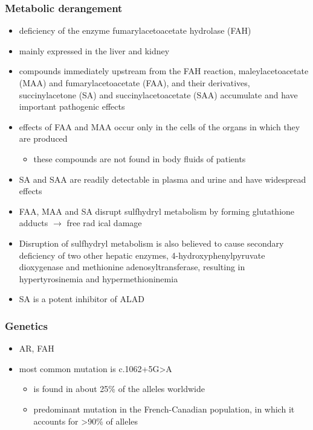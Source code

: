 \documentclass{scrartcl}
\begin{document}
\subsubsection{Metabolic derangement}
\label{sec:org4ccad70}
\begin{itemize}
\item deficiency of the enzyme fumarylacetoacetate hydrolase (FAH)
\end{itemize}
\begin{itemize}
\item mainly expressed in the liver and kidney
\item compounds immediately upstream from the FAH reaction,
maleylacetoacetate (MAA) and fumarylacetoacetate (FAA), and their
derivatives, succinylacetone (SA) and succinylacetoacetate (SAA)
accumulate and have important pathogenic effects
\item effects of FAA and MAA occur only in the cells of the organs in which they are produced
\begin{itemize}
\item these compounds are not found in body fluids of patients
\end{itemize}
\item SA and SAA are readily detectable in plasma and urine and have
widespread effects
\item FAA, MAA and SA disrupt sulfhydryl metabolism by forming glutathione
adducts \(\to\) free rad ical damage
\item Disruption of sulfhydryl metabolism is also believed to cause
secondary deficiency of two other hepatic enzymes,
4-hydroxyphenylpyruvate dioxygenase and methionine
adenosyltransferase, resulting in hypertyrosinemia and
hypermethioninemia
\item SA is a potent inhibitor of ALAD
\end{itemize}

\subsubsection{Genetics}
\label{sec:org3596946}
\begin{itemize}
\item AR, FAH
\item most common mutation is c.1062+5G>A
\begin{itemize}
\item is found in about 25\% of the alleles worldwide
\item predominant mutation in the French-Canadian population, in which
it accounts for >90\% of alleles
\end{itemize}
\end{itemize}
\end{document}
